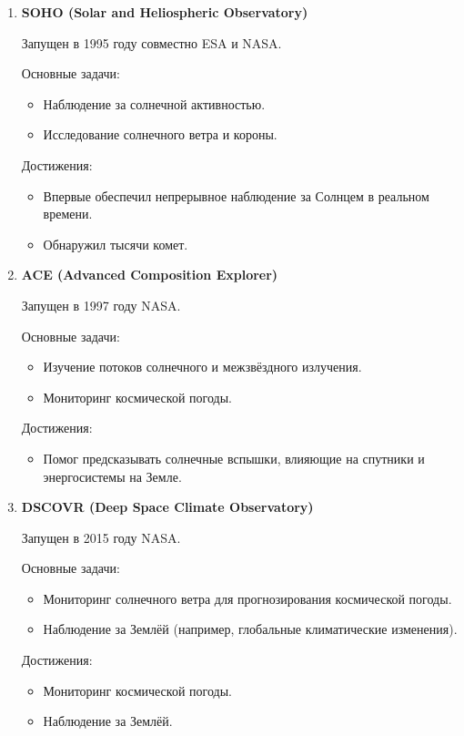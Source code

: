 \documentclass[a4paper,12pt]{article}
\begin{document}
\begin{enumerate}

\item \textbf{SOHO (Solar and Heliospheric Observatory)}

Запущен в 1995 году совместно ESA и NASA.

Основные задачи:
\begin{itemize}
\item Наблюдение за солнечной активностью.
\item Исследование солнечного ветра и короны.
\end{itemize}
Достижения:
\begin{itemize}
\item Впервые обеспечил непрерывное наблюдение за Солнцем в реальном времени.
\item Обнаружил тысячи комет.
\end{itemize}

\item \textbf{ACE (Advanced Composition Explorer)}

Запущен в 1997 году NASA.

Основные задачи:
\begin{itemize}
\item Изучение потоков солнечного и межзвёздного излучения.
\item Мониторинг космической погоды.
\end{itemize}
Достижения:
\begin{itemize}
\item Помог предсказывать солнечные вспышки, влияющие на спутники и энергосистемы на Земле.
\end{itemize}

\item \textbf{DSCOVR (Deep Space Climate Observatory)}

Запущен в 2015 году NASA.

Основные задачи:
\begin{itemize}
\item Мониторинг солнечного ветра для прогнозирования космической погоды.
\item Наблюдение за Землёй (например, глобальные климатические изменения).
\end{itemize}
Достижения:
\begin{itemize}
\item Мониторинг космической погоды.
\item Наблюдение за Землёй.
\end{itemize}

\end{enumerate}
\end{document}

